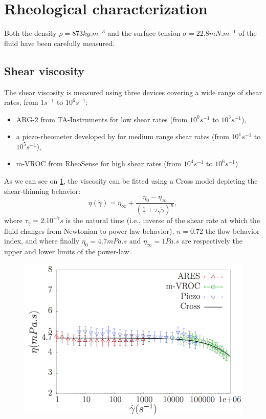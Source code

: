 \documentclass[twocolumn,10pt]{asme2ej}
\begin{document}
\section{Rheological characterization}
Both the density $\rho = 873 kg.m^{-3}$ and the surface tension $\sigma = 22.8 mN.m^{-1}$ of the fluid have been carefully measured.

\subsection{Shear viscosity}
The shear viscosity is measured using three devices covering a wide range of shear rates, from $1s^{-1}$ to $10^6 s^{-1}$:
\begin{itemize}
    \item ARG-2 from TA-Instruments for low shear rates (from $10^0 s^{-1}$ to $10^3 s^{-1}$),
    \item a piezo-rheometer developed by \cite{buchanan2005high} for medium range shear rates (from $10^1 s^{-1}$ to $10^5 s^{-1}$),
    \item m-VROC from RheoSense for high shear rates (from $10^4 s^{-1}$ to $10^6 s^{-1}$)
\end{itemize}
As we can see on \ref{beahaviorLaw}, the viscosity can be fitted using a Cross model depicting the shear-thinning behavior:
\begin{equation}
    \eta(\dot{\gamma})=\eta_{\infty} + \frac{\eta_0 - \eta_{\infty}}{(1+\tau_{\dot{\gamma}} \dot{\gamma})^{n}},
    \label{crossEq}
  \end{equation}
where $\tau_{\dot{\gamma}}=2.10^{-7}s$ is the natural time (i.e., inverse of the shear rate at which the fluid changes from Newtonian to power-law behavior), $n=0.72$ the flow behavior index, and where finally $\eta_0=4.7 mPa.s $ and $\eta_\infty = 1 Pa.s$ are respectively the upper and lower limits of the power-law.

\begin{figure}[H]
    \centering
    \includegraphics[width=12cm]{behaviorLaw.png}
    \caption{}
    \label{beahaviorLaw}
\end{figure}
\end{document}
